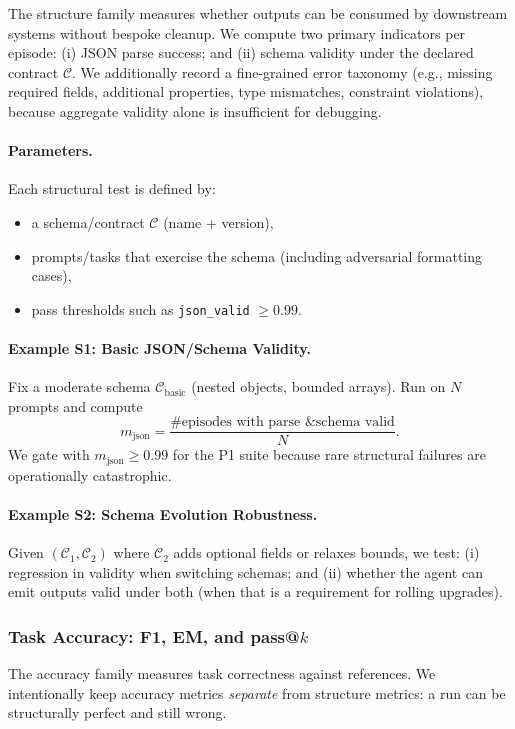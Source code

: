 The structure family measures whether outputs can be consumed by downstream systems without bespoke cleanup.
We compute two primary indicators per episode:
(i) JSON parse success; and (ii) schema validity under the declared contract $\mathcal{C}$.
We additionally record a fine-grained error taxonomy (e.g., missing required fields, additional properties, type mismatches, constraint violations), because aggregate validity alone is insufficient for debugging.

\paragraph{Parameters.}
Each structural test is defined by:
\begin{itemize}[leftmargin=12pt]
    \item a schema/contract $\mathcal{C}$ (name + version),
    \item prompts/tasks that exercise the schema (including adversarial formatting cases),
    \item pass thresholds such as \texttt{json\_valid} $\ge 0.99$.
\end{itemize}

\paragraph{Example S1: Basic JSON/Schema Validity.}
Fix a moderate schema $\mathcal{C}_{\text{basic}}$ (nested objects, bounded arrays).
Run on $N$ prompts and compute
\[
m_{\text{json}} = \frac{\#\text{episodes with parse \& schema valid}}{N}.
\]
We gate with $m_{\text{json}} \ge 0.99$ for the P1 suite because rare structural failures are operationally catastrophic.

\paragraph{Example S2: Schema Evolution Robustness.}
Given $(\mathcal{C}_1,\mathcal{C}_2)$ where $\mathcal{C}_2$ adds optional fields or relaxes bounds, we test:
(i) regression in validity when switching schemas; and (ii) whether the agent can emit outputs valid under both (when that is a requirement for rolling upgrades).

\subsubsection{Task Accuracy: F1, EM, and pass@\texorpdfstring{$k$}{k}}

The accuracy family measures task correctness against references.
We intentionally keep accuracy metrics \emph{separate} from structure metrics: a run can be structurally perfect and still wrong.

